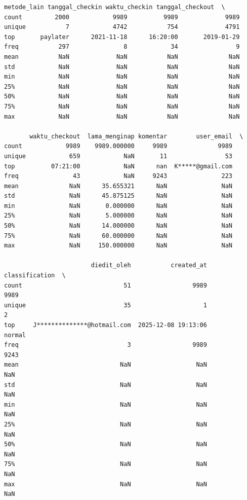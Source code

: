 \begin{lstlisting}[caption={Output 11}]
       metode_lain tanggal_checkin waktu_checkin tanggal_checkout  \
count         2000            9989          9989             9989   
unique           7            4742           754             4791   
top       paylater      2021-11-18      16:20:00       2019-01-29   
freq           297               8            34                9   
mean           NaN             NaN           NaN              NaN   
std            NaN             NaN           NaN              NaN   
min            NaN             NaN           NaN              NaN   
25%            NaN             NaN           NaN              NaN   
50%            NaN             NaN           NaN              NaN   
75%            NaN             NaN           NaN              NaN   
max            NaN             NaN           NaN              NaN   

       waktu_checkout  lama_menginap komentar        user_email  \
count            9989    9989.000000     9989              9989   
unique            659            NaN       11                53   
top          07:21:00            NaN      nan  K*****@gmail.com   
freq               43            NaN     9243               223   
mean              NaN      35.655321      NaN               NaN   
std               NaN      45.875125      NaN               NaN   
min               NaN       0.000000      NaN               NaN   
25%               NaN       5.000000      NaN               NaN   
50%               NaN      14.000000      NaN               NaN   
75%               NaN      60.000000      NaN               NaN   
max               NaN     150.000000      NaN               NaN   

                        diedit_oleh           created_at classification  \
count                            51                 9989           9989   
unique                           35                    1              2   
top     J**************@hotmail.com  2025-12-08 19:13:06         normal   
freq                              3                 9989           9243   
mean                            NaN                  NaN            NaN   
std                             NaN                  NaN            NaN   
min                             NaN                  NaN            NaN   
25%                             NaN                  NaN            NaN   
50%                             NaN                  NaN            NaN   
75%                             NaN                  NaN            NaN   
max                             NaN                  NaN            NaN   


\end{lstlisting}
